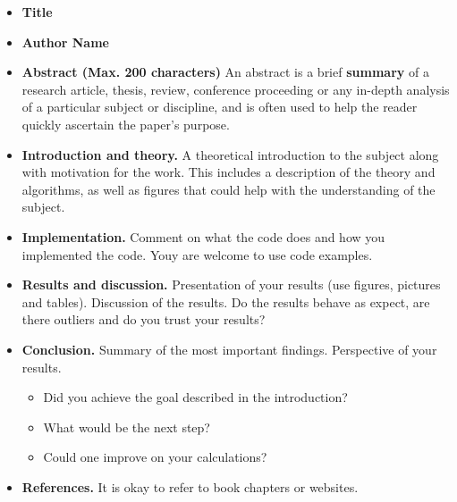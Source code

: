 \documentclass{article}
\begin{document}
\begin{itemize}

    \item {\bf Title}

    \item {\bf Author Name}


    \item {\bf Abstract (Max. 200 characters)}
        An abstract is a brief {\bf summary } of a research article, thesis, review, conference proceeding or any in-depth analysis of a particular subject or discipline, and is often used to help the reader quickly ascertain the paper's purpose.


    \item {\bf Introduction and theory.}
    A theoretical introduction to the subject along with motivation for the work.
    This includes a description of the theory and algorithms, as well as figures that could help with the understanding of the subject.

    \item {\bf Implementation.}
    Comment on what the code does and how you implemented the code.
    Youy are welcome to use code examples.

    \item {\bf Results and discussion.}
    Presentation of your results (use figures, pictures and tables).
    Discussion of the results.
    Do the results behave as expect, are there outliers and 
    do you trust your results?

    \item {\bf Conclusion.}
    Summary of the most important findings.
    Perspective of your results.

    \begin{itemize}
        \item Did you achieve the goal described in the introduction?
        \item What would be the next step?
        \item Could one improve on your calculations?
    \end{itemize}

    \item {\bf References.}
    It is okay to refer to book chapters or websites.

\end{itemize}











\end{document}
